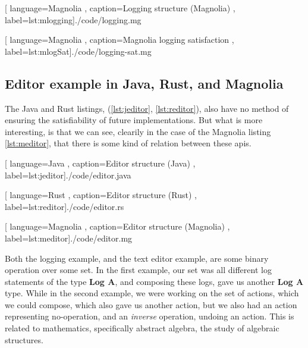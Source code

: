 \begin{center}
  
    [ language=Magnolia
    , caption={Logging structure (Magnolia)}
    , label=lst:mlogging]{./code/logging.mg}
\end{center}

\begin{center}
  
    [ language=Magnolia
    , caption={Magnolia logging satisfaction}
    , label=lst:mlogSat]{./code/logging-sat.mg}
\end{center}

\subsection{Editor example in Java, Rust, and Magnolia}

The Java and Rust listings, (\ref{lst:jeditor}, \ref{lst:reditor}), also have no
method of ensuring the satisfiability of future implementations. But what is
more interesting, is that we can see, clearily in the case of the Magnolia
listing \ref{lst:meditor}, that there is some kind of relation between these
\gls{api}s.

\begin{center}
  
    [ language=Java
    , caption={Editor structure (Java)}
    , label=lst:jeditor]{./code/editor.java}
\end{center}

\begin{center}
  
    [ language=Rust
    , caption={Editor structure (Rust)}
    , label=lst:reditor]{./code/editor.rs}
\end{center}

\begin{center}
  
    [ language=Magnolia
    , caption={Editor structure (Magnolia)}
    , label=lst:meditor]{./code/editor.mg}
\end{center}

Both the logging example, and the text editor example, are some binary operation
over some set. In the first example, our set was all different log statements of
the type \textbf{Log A}, and composing these logs, gave us another
\textbf{Log A} type. While in the second example, we were working on the set of
actions, which we could compose, which also gave us another action, but we also
had an action representing no-operation, and an \textit{inverse} operation,
undoing an action. This is related to mathematics, specifically abstract
algebra, the study of algebraic structures.

